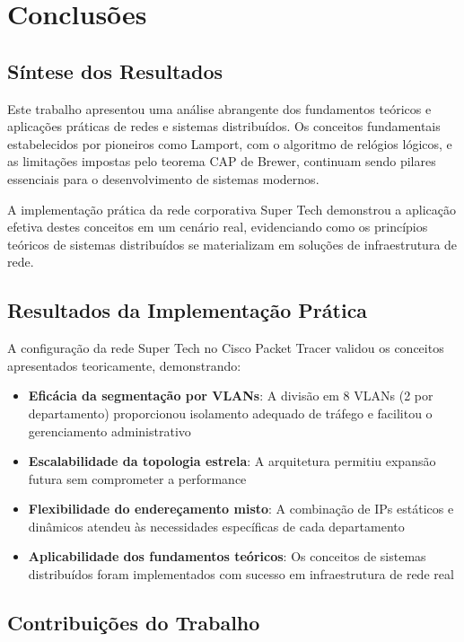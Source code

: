 \section{Conclusões}

\subsection{Síntese dos Resultados}

Este trabalho apresentou uma análise abrangente dos fundamentos teóricos e aplicações práticas de redes e sistemas distribuídos. Os conceitos fundamentais estabelecidos por pioneiros como Lamport, com o algoritmo de relógios lógicos, e as limitações impostas pelo teorema CAP de Brewer, continuam sendo pilares essenciais para o desenvolvimento de sistemas modernos.

A implementação prática da rede corporativa Super Tech demonstrou a aplicação efetiva destes conceitos em um cenário real, evidenciando como os princípios teóricos de sistemas distribuídos se materializam em soluções de infraestrutura de rede.

\subsection{Resultados da Implementação Prática}

A configuração da rede Super Tech no Cisco Packet Tracer validou os conceitos apresentados teoricamente, demonstrando:

\begin{itemize}
    \item \textbf{Eficácia da segmentação por VLANs}: A divisão em 8 VLANs (2 por departamento) proporcionou isolamento adequado de tráfego e facilitou o gerenciamento administrativo
    \item \textbf{Escalabilidade da topologia estrela}: A arquitetura permitiu expansão futura sem comprometer a performance
    \item \textbf{Flexibilidade do endereçamento misto}: A combinação de IPs estáticos e dinâmicos atendeu às necessidades específicas de cada departamento
    \item \textbf{Aplicabilidade dos fundamentos teóricos}: Os conceitos de sistemas distribuídos foram implementados com sucesso em infraestrutura de rede real
\end{itemize}

\subsection{Contribuições do Trabalho}

